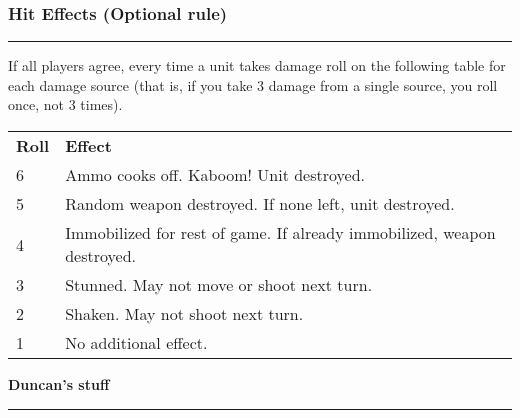 \documentclass[11pt]{article}
\newcommand{\myheading}[1]{
  \subsubsection*{\centering #1}
  \raggedright
  \hrule
}
\renewenvironment{description}
  {\list{}{\labelwidth=0pt \leftmargin=0pt
   \let\makelabel\descriptionlabel}}
  {\endlist}
\newenvironment{mydescription}{
\begin{description}
  \setlength{\itemsep}{1pt}
  \setlength{\parskip}{0pt}
  \setlength{\parsep}{0pt}}{\end{description}
}
\newcommand{\myarmytitle}[1]{
  \begin{center}
  \Huge{\bf#1}
  \end{center}
  \hrule
}
\begin{document}
\begin{multicols*}{3}[]
\begin{mydescription}
\end{mydescription}

\myheading{Hit Effects (Optional rule)}

If all players agree, every time a unit takes damage roll on the
following table for each damage source (that is, if you take 3 damage
from a single source, you roll once, not 3 times).

\noindent 
{}
\begin{tabular}{lp{5cm}}
\bf{Roll} & \bf{Effect} \\
6 & Ammo cooks off. Kaboom! Unit destroyed. \\
5 & Random weapon destroyed. If none left, unit destroyed. \\
4 & Immobilized for rest of game. If already immobilized, weapon
    destroyed. \\
3 & Stunned. May not move or shoot next turn. \\
2 & Shaken. May not shoot next turn. \\
1 & No additional effect.\\

\end{tabular}

\end{multicols*}

\newpage

\myarmytitle{Duncan's stuff}
\end{document}
